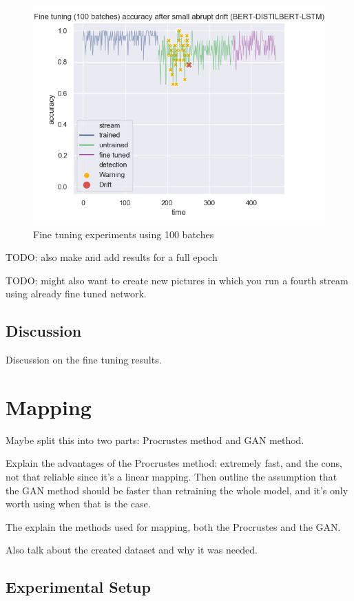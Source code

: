 \documentclass[12pt]{extreport}
\begin{document}
\begin{figure}[ht!]
\centering
\includegraphics[width=0.8\linewidth]{assets/addressing-change/fine_tuning_lstm_wos_1_BERT_DISTILBERT_100_batches.png}
\caption{Fine tuning experiments using 100 batches}
\label{fig:fine100}
\end{figure}

TODO: also make and add results for a full epoch

TODO: might also want to create new pictures in which you run a fourth stream using already fine tuned network.

\subsection{Discussion}

Discussion on the fine tuning results.

\section{Mapping}

Maybe split this into two parts: Procrustes method and GAN method.

Explain the advantages of the Procrustes method: extremely fast, and the cons, not that reliable since it's a linear mapping. Then outline the assumption that the GAN method should be faster than retraining the whole model, and it's only worth using when that is the case.

The explain the methods used for mapping, both the Procrustes and the GAN.

Also talk about the created dataset and why it was needed.

\subsection{Experimental Setup}
\end{document}
